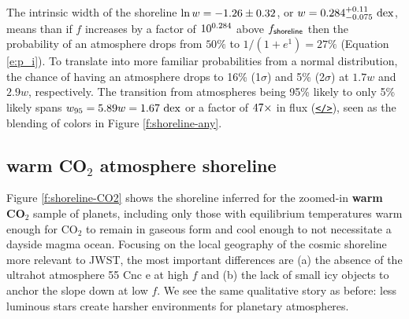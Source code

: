\documentclass[modern,linenumbers,trackchanges]{aastex7}
\begin{document}
The intrinsic width of the shoreline $\ln w = -1.26 \pm 0.32$, or $w = 0.284_{-0.075}^{+0.11}~\mathrm{dex}$, means than if $f$ increases by a factor of $10^{0.284}$ above $f_{\sf shoreline}$ then the probability of an atmosphere drops from $50\%$ to $1/(1 + e^{1}) = 27\%$ (Equation \ref{e:p_i}). To translate into more familiar probabilities from a normal distribution, the chance of having an atmosphere drops to 16\% (1$\sigma$) and 5\% (2$\sigma$) at $1.7w$ and $2.9w$, respectively. The transition from atmospheres being 95\% likely to only 5\% likely spans $w_{95} = 5.89w = 1.67~\mathrm{dex}$ or a factor of $47 \times$ in flux (\href{https://github.com/zkbt/shoreline/blob/main/notebooks/logistic-probabilities.ipynb}{\texttt{</>}}), seen as the blending of colors in Figure \ref{f:shoreline-any}. 




\subsection{{\bf warm CO$_2$} atmosphere shoreline}

Figure \ref{f:shoreline-CO2} shows the shoreline inferred for the zoomed-in {\bf warm CO$_2$} sample of planets, including only those with equilibrium temperatures warm enough for CO$_2$ to remain in gaseous form and cool enough to not necessitate a dayside magma ocean. Focusing on the local geography of the cosmic shoreline more relevant to JWST, the most important differences are (a) the absence of the ultrahot atmosphere 55 Cnc e at high $f$ and (b) the lack of small icy objects to anchor the slope down at low $f$. We see the same qualitative story as before: less luminous stars create harsher environments for planetary atmospheres. 
\end{document}
